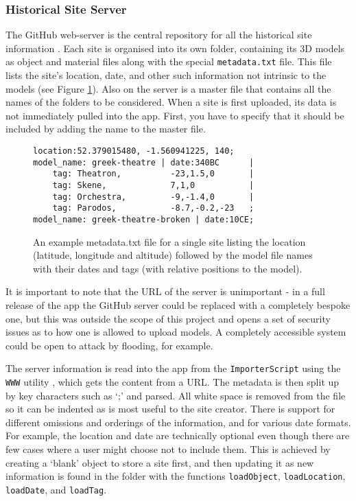 \documentclass[12pt, a4paper]{article}
\begin{document}
\subsubsection{Historical Site Server}
The GitHub web-server is the central repository for all the historical site information \cite{tools:repo}. Each site is organised into its own folder, containing its 3D models as object and material files along with the special \verb|metadata.txt| file. This file lists the site's location, date, and other such information not intrinsic to the models (see Figure \ref{fig:metadataexample}). Also on the server is a master file that contains all the names of the folders to be considered. When a site is first uploaded, its data is not immediately pulled into the app. First, you have to specify that it should be included by adding the name to the master file. 

\begin{figure}[h]
    \centering
\begin{mdframed}[leftmargin=50pt, rightmargin=50pt]
    \begin{verbatim}
location:52.379015480, -1.560941225, 140;
model_name: greek-theatre | date:340BC      |
    tag: Theatron,          -23,1.5,0       |
    tag: Skene,             7,1,0           | 
    tag: Orchestra,         -9,-1.4,0       | 
    tag: Parodos,           -8.7,-0.2,-23   ;
model_name: greek-theatre-broken | date:10CE;\end{verbatim}
\end{mdframed}
    \caption{An example metadata.txt file for a single site listing the location (latitude, longitude and altitude) followed by the model file names with their dates and tags (with relative positions to the model). }
    \label{fig:metadataexample}
\end{figure}

It is important to note that the URL of the server is unimportant - in a full release of the app the GitHub server could be replaced with a completely bespoke one, but this was outside the scope of this project and opens a set of security issues as to how one is allowed to upload models. A completely accessible system could be open to attack by flooding, for example.

The server information is read into the app from the \verb|ImporterScript| using the \verb|WWW| utility \cite{models:www}, which gets the content from a URL. The metadata is then split up by key characters such as `;' and parsed. All white space is removed from the file so it can be indented as is most useful to the site creator. There is support for different omissions and orderings of the information, and for various date formats. For example, the location and date are technically optional even though there are few cases where a user might choose not to include them. This is achieved by creating a `blank' object to store a site first, and then updating it as new information is found in the folder with the functions \verb|loadObject|, \verb|loadLocation|, \verb|loadDate|, and \verb|loadTag|.
\end{document}
